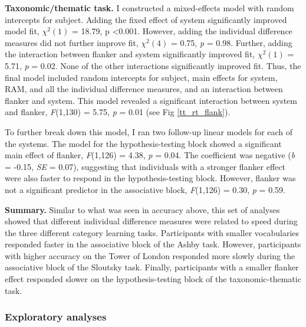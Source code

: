 \documentclass[../dissertation.tex]{subfiles}
\begin{document}
\textbf{Taxonomic/thematic task.}  I constructed a mixed-effects model with random intercepts for subject. Adding the fixed effect of system significantly improved model fit,  $\chi^{2}(1)$ = 18.79, p \textless 0.001. However, adding the individual difference measures did not further improve fit,  $\chi^{2}(4)$ = 0.75, \textit{p} = 0.98. Further, adding the interaction between flanker and system significantly improved fit, $\chi^{2}(1)$ = 5.71, \textit{p} = 0.02. None of the other interactions significantly improved fit. Thus, the final model included random intercepts for subject, main effects for system, RAM, and all the individual difference measures, and an interaction between flanker and system. This model revealed a significant interaction between system and flanker, \textit{F}(1,130) = 5.75, \textit{p} = 0.01 (see Fig \ref{tt_rt_flank}). \par 
	To further break down this model, I ran two follow-up linear models for each of the systems. The model for the hypothesis-testing block showed a significant main effect of flanker, \textit{F}(1,126) = 4.38, \textit{p} = 0.04. The coefficient was negative (\textit{b} = -0.15, \textit{SE} = 0.07), suggesting that individuals with a stronger flanker effect were also faster to respond in the hypothesis-testing block. However, flanker was not a significant predictor in the associative block, \textit{F}(1,126) = 0.30, \textit{p} = 0.59.  \par
\textbf{Summary.} Similar to what was seen in accuracy above, this set of analyses showed that different individual difference measures were related to speed during the three different category learning tasks. Participants with smaller vocabularies responded faster in the associative block of the Ashby task. However, participants with higher accuracy on the Tower of London responded more slowly during the associative block of the Sloutsky task. Finally, participants with a smaller flanker effect responded slower on the hypothesis-testing block of the taxonomic-thematic task.

\subsubsection{Exploratory analyses}
\end{document}

